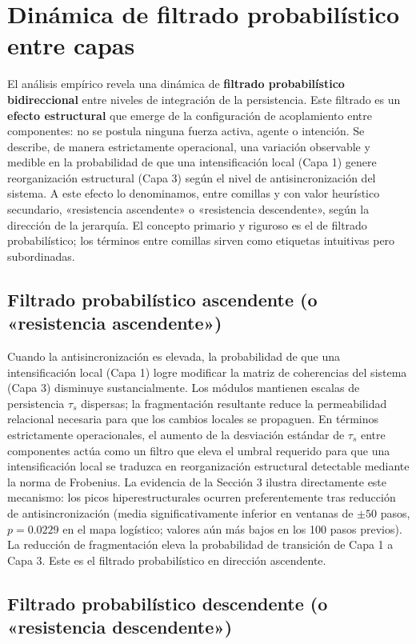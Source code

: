 \section{Dinámica de filtrado probabilístico entre capas}

El análisis empírico revela una dinámica de \textbf{filtrado probabilístico bidireccional} entre niveles de integración de la persistencia. Este filtrado es un \textbf{efecto estructural} que emerge de la configuración de acoplamiento entre componentes: no se postula ninguna fuerza activa, agente o intención. Se describe, de manera estrictamente operacional, una variación observable y medible en la probabilidad de que una intensificación local (Capa 1) genere reorganización estructural (Capa 3) según el nivel de antisincronización del sistema. A este efecto lo denominamos, entre comillas y con valor heurístico secundario, «resistencia ascendente» o «resistencia descendente», según la dirección de la jerarquía. El concepto primario y riguroso es el de filtrado probabilístico; los términos entre comillas sirven como etiquetas intuitivas pero subordinadas.

\subsection{Filtrado probabilístico ascendente (o «resistencia ascendente»)}

Cuando la antisincronización es elevada, la probabilidad de que una intensificación local (Capa 1) logre modificar la matriz de coherencias del sistema (Capa 3) disminuye sustancialmente. Los módulos mantienen escalas de persistencia $\tau_s$ dispersas; la fragmentación resultante reduce la permeabilidad relacional necesaria para que los cambios locales se propaguen. En términos estrictamente operacionales, el aumento de la desviación estándar de $\tau_s$ entre componentes actúa como un filtro que eleva el umbral requerido para que una intensificación local se traduzca en reorganización estructural detectable mediante la norma de Frobenius. La evidencia de la Sección 3 ilustra directamente este mecanismo: los picos hiperestructurales ocurren preferentemente tras reducción de antisincronización (media significativamente inferior en ventanas de $\pm 50$ pasos, $p=0.0229$ en el mapa logístico; valores aún más bajos en los 100 pasos previos). La reducción de fragmentación eleva la probabilidad de transición de Capa 1 a Capa 3. Este es el filtrado probabilístico en dirección ascendente.

\subsection{Filtrado probabilístico descendente (o «resistencia descendente»)}


